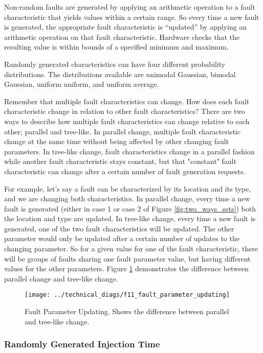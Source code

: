 \documentclass[]{report}
\begin{document}
Non-random faults are generated by applying an arithmetic operation to a fault characteristic that yields values within a certain range. So every time a new fault is generated, the appropriate fault characteristic is “updated” by applying an arithmetic operation on that fault characteristic. Hardware checks that the resulting value is within bounds of a specified minimum and maximum.

Randomly generated characteristics can have four different probability distributions. The distributions available are unimodal Gaussian, bimodal Gaussian, uniform uniform, and uniform average. 

Remember that multiple fault characteristics can change. How does each fault characteristic change in relation to other fault characteristics? There are two ways to describe how multiple fault characteristics can change relative to each other; parallel and tree-like. In parallel change, multiple fault characteristic change at the same time without being affected by other changing fault parameters. In tree-like change, fault characteristics change in a parallel fashion while another fault characteristic stays constant, but that "constant" fault characteristic can change after a certain number of fault generation requests. 

For example, let’s say a fault can be characterized by its location and its type, and we are changing both characteristics. In parallel change, every time a new fault is generated (either in case 1 or case 2 of Figure \ref{fig:two_ways_sets}) both the location and type are updated. In tree-like change, every time a new fault is generated, one of the two fault characteristics will be updated. The other parameter would only be updated after a certain number of updates to the changing parameter. So for a given value for one of the fault characteristic, there will be groups of faults sharing one fault parameter value, but having different values for the other parameters. Figure \ref{fig:faultparameterupdating} demonstrates the difference between parallel change and tree-like change. 

\begin{figure}[h]
	\centering
	\texttt{[image: ../technical\_diags/f11\_fault\_parameter\_updating]}
	\caption{Fault Parameter Updating. Shows the difference between parallel and tree-like change.}
	\label{fig:faultparameterupdating}
\end{figure}

\subsubsection{Randomly Generated Injection Time}
\label{ss rand gen inj time}
\end{document}
